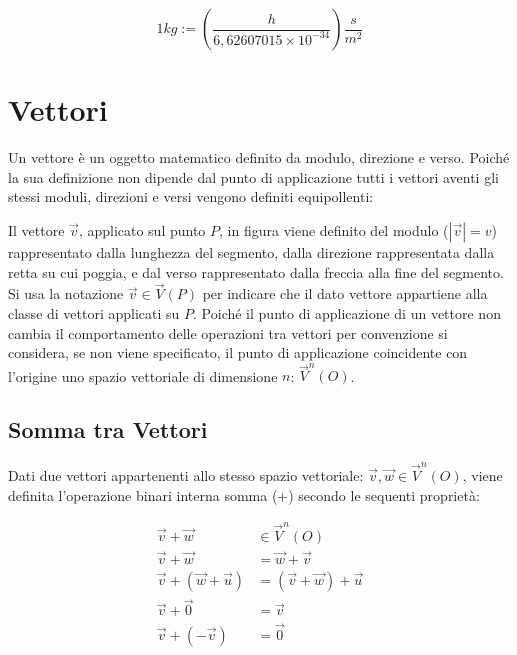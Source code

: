 \documentclass{article}
\numberwithin{equation}{subsection}
\begin{document}
\begin{equation*}
    1kg := \left(\displaystyle\frac{ h}{ 6{,}62607015 \times 10^{-34}}\right)\frac{\displaystyle s}{\displaystyle m^{2}}
\end{equation*}
\clearpage

\section{Vettori}
Un vettore è un oggetto matematico definito da modulo, direzione e verso. Poiché la sua definizione non dipende dal punto di applicazione tutti i vettori aventi gli stessi moduli, direzioni e versi vengono definiti equipollenti:

\begin{center}\end{center}

Il vettore $\vec{v}$, applicato sul punto $P$, in figura viene definito del modulo ($|\vec{v}| = v$) rappresentato dalla lunghezza del segmento, dalla direzione rappresentata dalla retta su cui poggia, e dal verso rappresentato dalla freccia alla fine del segmento.
Si usa la notazione $\vec{v}\in\vec{V}{\left(P\right)}$ per indicare che  il dato vettore appartiene alla classe di vettori applicati su $P$. Poich\'{e} il punto di applicazione di un vettore non cambia il comportamento delle operazioni tra vettori per convenzione si considera, se non viene specificato, il punto di applicazione coincidente con l'origine uno spazio vettoriale di dimensione $n$: $\vec{V}^{n}\left(O\right)$.

\subsection{Somma tra Vettori}
Dati due vettori appartenenti allo stesso spazio vettoriale: $\vec{v}, \vec{w} \in \vec{V}^{n}\left(O\right)$, viene definita l'operazione binari interna somma ($+$) secondo le sequenti proprietà:

\begin{align*}
    \vec{v} + \vec{w} &\in \vec{V}^{n}\left(O\right)\\
    \vec{v} + \vec{w} &= \vec{w} + \vec{v}\\
    \vec{v} + \left(\vec{w} + \vec{u}\right) &= \left(\vec{v} + \vec{w}\right) + \vec{u}\\
    \vec{v} + \vec{0} &= \vec{v}\\ 
    \vec{v} + (-\vec{v}) &= \vec{0}
\end{align*}
\end{document}
